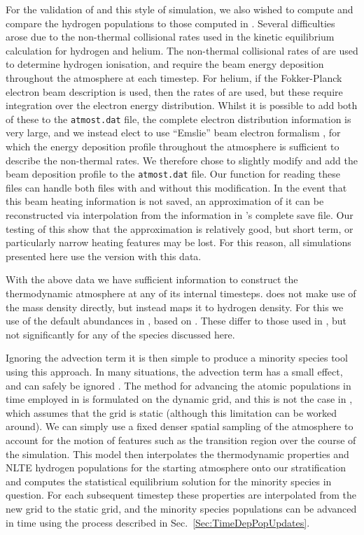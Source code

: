 For the validation of \Lw{} and this style of simulation, we also wished to compute and compare the hydrogen populations to those computed in \Radyn{}.
Several difficulties arose due to the non-thermal collisional rates used in the kinetic equilibrium calculation for hydrogen and helium.
The non-thermal collisional rates of \citet{1993Fang} are used to determine hydrogen ionisation, and require the beam energy deposition throughout the atmosphere at each timestep.
For helium, if the Fokker-Planck electron beam description is used, then the rates of \citet{Arnaud1985} are used, but these require integration over the electron energy distribution.
Whilst it is possible to add both of these to the \texttt{atmost.dat} file, the complete electron distribution information is very large, and we instead elect to use ``Emslie'' beam electron formalism \citep{Emslie1978}, for which the energy deposition profile throughout the atmosphere is sufficient to describe the non-thermal rates.
We therefore chose to slightly modify \Radyn{} and add the beam deposition profile to the \texttt{atmost.dat} file.
Our function for reading these files can handle both files with and without this modification.
In the event that this beam heating information is not saved, an approximation of it can be reconstructed via interpolation from the information in \Radyn{}'s complete save file.
Our testing of this show that the approximation is relatively good, but short term, or particularly narrow heating features may be lost.
For this reason, all simulations presented here use the version with this data.

With the above data we have sufficient information to construct the \Radyn{} thermodynamic atmosphere at any of its internal timesteps.
\Lw{} does not make use of the mass density directly, but instead maps it to hydrogen density.
For this we use of the default abundances in \Lw{}, based on \citet{Asplund2009}.
These differ to those used in \Radyn{}, but not significantly for any of the species discussed here.

Ignoring the advection term it is then simple to produce a minority species tool using this approach.
In many situations, the advection term has a small effect, and can safely be ignored \citep{Kasparova2003,Nejezchleba1998}. 
The method for advancing the atomic populations in time employed in \Radyn{} is formulated on the dynamic grid, and this is not the case in \Lw{}, which assumes that the grid is static (although this limitation can be worked around).
We can simply use a fixed denser spatial sampling of the atmosphere to account for the motion of features such as the transition region over the course of the simulation.
This model then interpolates the thermodynamic properties and NLTE hydrogen populations for the starting atmosphere onto our stratification and computes the statistical equilibrium solution for the minority species in question.
For each subsequent timestep these properties are interpolated from the new \Radyn{} grid to the static grid, and the minority species populations can be advanced in time using the process described in Sec.~\ref{Sec:TimeDepPopUpdates}.

